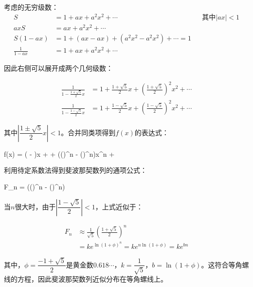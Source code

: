 考虑的无穷级数：
\begin{align*}
S &= 1 + ax + a^2x^2 + \dotsb && \text{其中} |ax| < 1 \\
axS &= ax + a^2x^2 + \dotsb \\
S(1 - ax) &= 1 + (ax - ax) + (a^2x^2 - a^2x^2) + \dotsb = 1 \\
\frac{1}{1 - ax} &= 1 + ax + a^2x^2 + \dotsb
\end{align*}

因此右侧可以展开成两个几何级数：

\begin{align*}
\frac{1}{1 - \frac{1 + \sqrt{5}}{2}x} &= 1 + \frac{1 + \sqrt{5}}{2}x + (\frac{1 + \sqrt{5}}{2})^2x^2 + \dotsb \\
\frac{1}{1 - \frac{1 - \sqrt{5}}{2}x} &= 1 + \frac{1 - \sqrt{5}}{2}x + (\frac{1 - \sqrt{5}}{2})^2x^2 + \dotsb
\end{align*}

其中$|\dfrac{1\pm\sqrt{5}}{2}x| < 1$。合并同类项得到$f(x)$的表达式：

\be
f(x) = ( - )x + \dotsb + (()^n - ()^n)x^n + \dotsb
\ee

利用待定系数法得到斐波那契数列的通项公式：

\be
F_n = (()^n - ()^n)
\ee

当$n$很大时，由于$|\dfrac{1 - \sqrt{5}}{2}| < 1$，上式近似于：

\begin{align*}
F_n &\approx \frac{1}{\sqrt{5}}(\frac{1 + \sqrt{5}}{2})^n \\
  &= ke^{\ln (1 + \phi)^n} = ke^{n\ln(1 + \phi)} = ke^{bn}
\end{align*}

其中，$\phi = \dfrac{-1 + \sqrt{5}}{2}$是黄金数$0.618\dotsm$，$k = \dfrac{1}{\sqrt{5}}$，$b = \ln (1 + \phi)$。这符合等角螺线的方程，因此斐波那契数列近似分布在等角螺线上。
